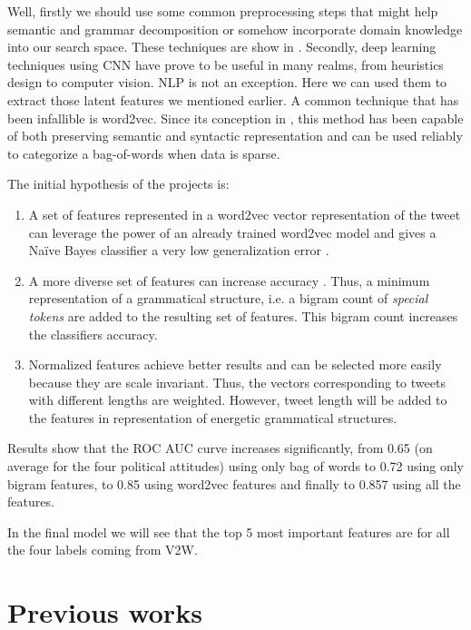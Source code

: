 \documentclass[author-year, review]{elsarticle} %
\let\parencite\cite
\begin{document}
Well, firstly we should use some common preprocessing steps that might
help semantic and grammar decomposition or somehow incorporate domain
knowledge into our search space. These techniques are show in
.
Secondly, deep learning techniques using CNN have prove to be useful in
many realms, from heuristics design to computer vision. NLP is not an
exception. Here we can used them to extract those latent features we
mentioned earlier. A common technique that has been infallible is
word2vec. Since its conception in
\parencite{2013},
this method has been capable of both preserving semantic and syntactic
representation and can be used reliably to categorize a bag-of-words
when data is sparse.

The initial hypothesis of the projects is:

\begin{enumerate}
\def\labelenumi{\arabic{enumi}.}
\item
  A set of features represented in a word2vec vector representation of
  the tweet can leverage the power of an already trained word2vec model
  and gives a Naïve Bayes classifier a very low generalization error
  \footnotemark{}.
\item
  A more diverse set of features can increase accuracy
  \parencite{2018}.
  Thus, a minimum representation of a grammatical structure, i.e. a
  bigram count of \emph{special tokens} are added to the resulting set
  of features. This bigram count increases the classifiers accuracy.
\item
  Normalized features achieve better results and can be selected more
  easily because they are scale invariant. Thus, the vectors
  corresponding to tweets with different lengths are weighted. However,
  tweet length will be added to the features in representation of
  energetic grammatical structures.
\end{enumerate}

Results show that the ROC AUC curve increases significantly, from 0.65
(on average for the four political attitudes) using only bag of words to
0.72 using only bigram features, to 0.85 using word2vec features and
finally to 0.857 using all the features.

In the final model we will see that the top 5 most important features
are for all the four labels coming from V2W.

\section{Previous works}\label{previous-works}
\end{document}
